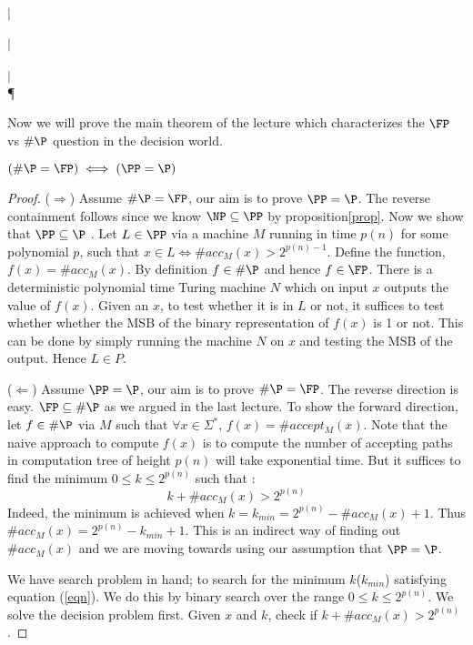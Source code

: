 \documentclass{report}
\begin{document}
\begin{center}
\PSPACE \\ 
$\vert$ \\
\PP \\
$\vert$ \\
\NP \\
$\vert$ \\
\P
\end{center}

Now we will prove the main theorem of the lecture which characterizes the $\FP$ vs $\#\P$ question in the decision world.

\begin{theorem}
 $(\#\P = \FP) \iff (\PP = \P)$
\end{theorem}
\begin{proof}
($\Rightarrow$) Assume $\#\P = \FP$, our aim is to prove $\PP = \P$. The reverse containment follows since we know $\NP \subseteq \PP$ by proposition\ref{prop}. Now we show that $\PP \subseteq \P$ . Let $L \in \PP$
via a machine $M$ running in time $p(n)$ for some polynomial $p$, such that $x \in L \iff \#acc_M(x) > 2^{p(n)-1}$.
Define the function, $f(x) = \#acc_M(x)$. By definition $f \in \#\P$ and hence $f \in \FP$. There is a deterministic polynomial time Turing machine $N$ which on input $x$ outputs the value of $f(x)$. Given an $x$, to test whether it is in $L$ or not, it suffices to test whether whether the MSB of the binary representation of $f(x)$ is 1 or not. This can be done by simply running the machine $N$ on $x$ and testing the MSB of the output. Hence $L \in P$.

($\Leftarrow$) Assume $\PP = \P$, our aim is to prove $\#\P = \FP$. The reverse direction is easy. $\FP \subseteq \#\P$ as we argued in the last lecture. To show the forward direction, let $f\in \#\P$ via $M$ such that $\forall x \in \Sigma^*$, $f(x)=\# accept_M(x)$. Note that the naive approach to compute $f(x)$ is to compute the number of accepting paths in computation tree of height $p(n)$ will take exponential time. But it suffices to find the minimum $0 \le k \le 2^{p(n)}$ such that :
\begin{equation}
\label{eqn}
k+\#acc_M(x) > 2^{p(n)}
\end{equation}
Indeed, the minimum is achieved when $k = k_{min} = 2^{p(n)} - \#acc_M(x) + 1$. Thus $\#acc_M(x) = 2^{p(n)} - k_{min} +1$. This is an indirect way of finding out $\#acc_M(x)$ and we are moving towards using our assumption that $\PP = \P$.

We have  search problem in hand; to search for the minimum $k$($k_{min}$) satisfying equation (\ref{eqn}). We do this by binary search over the range $0 \le k \le 2^{p(n)}$. We solve the decision problem first. {\sf Given $x$ and $k$, check if $k+\#acc_M(x) > 2^{p(n)}$}.


\end{proof}
\end{document}

